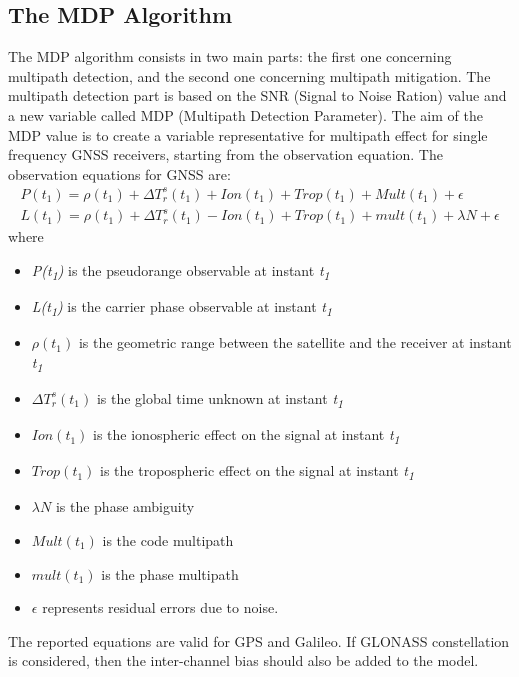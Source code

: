 \subsection{The MDP Algorithm}
The MDP algorithm consists in two main parts: the first one concerning multipath detection, and the second one concerning multipath mitigation.
The multipath detection part is based on the SNR (Signal to Noise Ration) value and a new variable called MDP (Multipath Detection Parameter). The aim of the MDP value is to create a variable representative for multipath effect for single frequency GNSS receivers, starting from the observation equation. 
The observation equations for GNSS are:
\begin{equation}
    \begin{matrix}
        P(t_{1})=\rho(t_{1})+\Delta T_{r}^{s}(t_{1}) + Ion(t_{1}) + Trop(t_{1}) + Mult(t_{1}) + \epsilon \\
        L(t_{1})=\rho(t_{1})+\Delta T_{r}^{s}(t_{1}) - Ion(t_{1}) + Trop(t_{1}) + mult(t_{1}) + \lambda N+ \epsilon
    \end{matrix}
\label{eq:obs_multipath}
\end{equation}
where
\begin{itemize}
\item \textit{P(t\textsubscript{1})} is the pseudorange observable at instant \textit{t\textsubscript{1}}
\item \textit{L(t\textsubscript{1})} is the carrier phase observable at instant \textit{t\textsubscript{1}}
\item $\rho(t_{1})$ is the geometric range between the satellite and the receiver at instant \textit{t\textsubscript{1}}
\item $\Delta T_{r}^{s}(t_{1})$ is the global time unknown at instant \textit{t\textsubscript{1}}
\item $Ion(t_{1})$ is the ionospheric effect on the signal at instant \textit{t\textsubscript{1}}
\item $Trop(t_{1})$ is the tropospheric effect on the signal at instant \textit{t\textsubscript{1}}
\item $\lambda N$ is the phase ambiguity
\item $Mult(t_{1})$ is the code multipath
\item $mult(t_{1})$ is the phase multipath
\item $\epsilon$ represents residual errors due to noise.
\end{itemize}

The reported equations are valid for GPS and Galileo. If GLONASS constellation is considered, then the inter-channel bias should also be added to the model.

